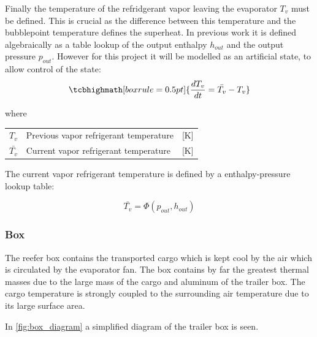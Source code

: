 Finally the temperature of the refridgerant vapor leaving the evaporator $T_v$ must be defined. This is crucial as the difference between this temperature and the bubblepoint temperature defines the superheat. In previous work \cite{Sorensen2013} it is defined algebraically as a table lookup of the output enthalpy $h_{out}$ and the output pressure $p_{out}$. However for this project it will be modelled as an artificial state, to allow control of the state:\\

\begin{equation}\label{eq:tv_initial}
	\tcbhighmath[boxrule = 0.5pt]{\frac{dT_{v}}{dt} = \bar{T_v} - T_v} %
\end{equation}

where\\

\begin{center}
	\begin{tabular}{l p{10cm} l}
		$T_v $       	 & Previous vapor refrigerant temperature                                  & [\si{K}] 						\\
		$\bar{T_v} $     & Current vapor refrigerant temperature                                   & [\si{K}]                  \\
	\end{tabular}
\end{center}

The current vapor refrigerant temperature is defined by a enthalpy-pressure lookup table:

\begin{equation}
	\bar{T_v} = \Phi(p_{out}, h_{out})
\end{equation}


\newpage

\subsubsection{Box} \label{sec:mod_box}
The reefer box contains the transported cargo which is kept cool by the air which is circulated by the evaporator fan. The box contains by far the greatest thermal masses due to the large mass of the cargo and aluminum of the trailer box. The cargo temperature is strongly coupled to the surrounding air temperature due to its large surface area.

In \cref{fig:box_diagram} a simplified diagram of the trailer box is seen.

